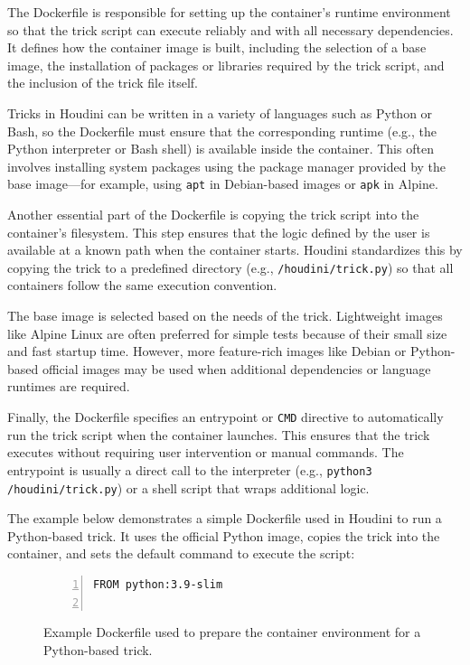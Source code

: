 \documentclass[12pt]{report}
\begin{document}
\begin{doublespace}
The Dockerfile is responsible for setting up the container's runtime environment so that the trick script can execute reliably and with all necessary dependencies. It defines how the container image is built, including the selection of a base image, the installation of packages or libraries required by the trick script, and the inclusion of the trick file itself.

Tricks in Houdini can be written in a variety of languages such as Python or Bash, so the Dockerfile must ensure that the corresponding runtime (e.g., the Python interpreter or Bash shell) is available inside the container. This often involves installing system packages using the package manager provided by the base image—for example, using \texttt{apt} in Debian-based images or \texttt{apk} in Alpine.

Another essential part of the Dockerfile is copying the trick script into the container's filesystem. This step ensures that the logic defined by the user is available at a known path when the container starts. Houdini standardizes this by copying the trick to a predefined directory (e.g., \texttt{/houdini/trick.py}) so that all containers follow the same execution convention.

The base image is selected based on the needs of the trick. Lightweight images like Alpine Linux are often preferred for simple tests because of their small size and fast startup time. However, more feature-rich images like Debian or Python-based official images may be used when additional dependencies or language runtimes are required.

Finally, the Dockerfile specifies an entrypoint or \texttt{CMD} directive to automatically run the trick script when the container launches. This ensures that the trick executes without requiring user intervention or manual commands. The entrypoint is usually a direct call to the interpreter (e.g., \texttt{python3 /houdini/trick.py}) or a shell script that wraps additional logic.

The example below demonstrates a simple Dockerfile used in Houdini to run a Python-based trick. It uses the official Python image, copies the trick into the container, and sets the default command to execute the script:

\begin{figure}[H]
\caption{Example Dockerfile used to prepare the container environment for a Python-based trick.}
\label{fig:dockerfile-example}
\begin{lstlisting}[numbers=left, numberstyle=\tiny, stepnumber=1, breaklines=true, frame=single, backgroundcolor=\color{gray!10}, basicstyle=\ttfamily\scriptsize, showspaces=false, showstringspaces=false]
FROM python:3.9-slim


\end{lstlisting}
\end{figure}
\end{doublespace}
\end{document}
